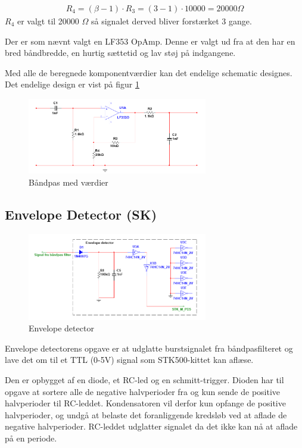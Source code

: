 \begin{align}
R_4 = (\beta - 1) \cdot R_3 = (3 - 1) \cdot 10000 = 20000 \Omega
\end{align} 
$R_4$ er valgt til 20000 $\Omega$ så signalet derved bliver forstærket 3 gange.

Der er som nævnt valgt en LF353 OpAmp. Denne er valgt ud fra at den har en bred båndbredde, en hurtig sættetid og lav støj på indgangene. 

Med alle de beregnede komponentværdier kan det endelige schematic designes. Det endelige design er vist på figur \ref{fig:BAANDPAS_MV} 

\begin{figure}[htbp]
	\centering
	\includegraphics[width=0.70\textwidth]{billeder/HWdesign/BAANDPAS_MV.png}
	\caption{Båndpas med værdier}
	\label{fig:BAANDPAS_MV}
\end{figure}
 

\newpage

\subsection{Envelope Detector (SK)}

\begin{figure}[htbp]
	\centering
	\includegraphics[width=0.70\textwidth]{billeder/HWdesign/ED_MV.png}
	\caption{Envelope detector}
	\label{fig:ED_MV}
\end{figure}

Envelope detectorens opgave er at udglatte burstsignalet fra båndpasfilteret og lave det om til et TTL (0-5V) signal som STK500-kittet kan aflæse.

Den er opbygget af en diode, et RC-led og en schmitt-trigger. Dioden har til opgave at sortere alle de negative halvperioder fra og kun sende de positive halvperioder til RC-leddet. Kondensatoren vil derfor kun opfange de positive halvperioder, og undgå at belaste det foranliggende kredsløb ved at aflade de negative halvperioder. RC-leddet udglatter signalet da det ikke kan nå at aflade på en periode.

